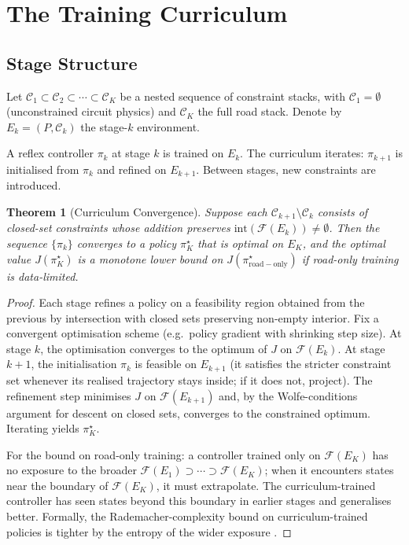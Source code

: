 \documentclass[11pt,twocolumn]{article}
\newtheorem{theorem}{Theorem}
\theoremstyle{definition}
\theoremstyle{remark}
\newcommand{\Feas}{\mathcal{F}}
\newcommand{\cC}{\mathcal{C}}
\begin{document}
\section{The Training Curriculum}
\label{sec:curriculum}

\subsection{Stage Structure}

Let $\cC_1 \subset \cC_2 \subset \cdots \subset \cC_K$ be a nested sequence of constraint stacks, with $\cC_1 = \emptyset$ (unconstrained circuit physics) and $\cC_K$ the full road stack. Denote by $E_k = (P, \cC_k)$ the stage-$k$ environment.

A reflex controller $\pi_k$ at stage $k$ is trained on $E_k$. The curriculum iterates: $\pi_{k+1}$ is initialised from $\pi_k$ and refined on $E_{k+1}$. Between stages, new constraints are introduced.

\begin{theorem}[Curriculum Convergence]\label{thm:curriculum}
Suppose each $\cC_{k+1} \setminus \cC_k$ consists of closed-set constraints whose addition preserves $\mathrm{int}(\Feas(E_k)) \ne \emptyset$. Then the sequence $\{\pi_k\}$ converges to a policy $\pi_K^{\star}$ that is optimal on $E_K$, and the optimal value $J(\pi_K^{\star})$ is a monotone lower bound on $J(\pi_{\mathrm{road-only}}^{\star})$ if road-only training is data-limited.
\end{theorem}

\begin{proof}
Each stage refines a policy on a feasibility region obtained from the previous by intersection with closed sets preserving non-empty interior. Fix a convergent optimisation scheme (e.g.\ policy gradient with shrinking step size). At stage $k$, the optimisation converges to the optimum of $J$ on $\Feas(E_k)$. At stage $k+1$, the initialisation $\pi_k$ is feasible on $E_{k+1}$ (it satisfies the stricter constraint set whenever its realised trajectory stays inside; if it does not, project). The refinement step minimises $J$ on $\Feas(E_{k+1})$ and, by the Wolfe-conditions argument for descent on closed sets, converges to the constrained optimum. Iterating yields $\pi_K^{\star}$.

For the bound on road-only training: a controller trained only on $\Feas(E_K)$ has no exposure to the broader $\Feas(E_1) \supset \cdots \supset \Feas(E_K)$; when it encounters states near the boundary of $\Feas(E_K)$, it must extrapolate. The curriculum-trained controller has seen states beyond this boundary in earlier stages and generalises better. Formally, the Rademacher-complexity bound on curriculum-trained policies is tighter by the entropy of the wider exposure \cite{bartlett2002rademacher}.
\end{proof}
\end{document}
